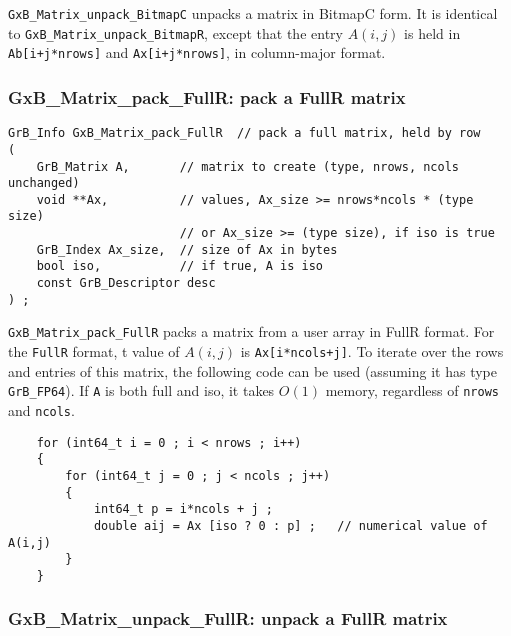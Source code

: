 \documentclass[12pt]{article}
\begin{document}
\verb'GxB_Matrix_unpack_BitmapC' unpacks a matrix in BitmapC form.
It is identical to \verb'GxB_Matrix_unpack_BitmapR', except that the
entry $A(i,j)$ is held in \verb'Ab[i+j*nrows]' and \verb'Ax[i+j*nrows]',
in column-major format.

\newpage
\subsubsection{{\sf GxB\_Matrix\_pack\_FullR:} pack a FullR matrix}
\label{matrix_pack_fullr}

\begin{mdframed}[userdefinedwidth=6in]
{\footnotesize
\begin{verbatim}
GrB_Info GxB_Matrix_pack_FullR  // pack a full matrix, held by row
(
    GrB_Matrix A,       // matrix to create (type, nrows, ncols unchanged)
    void **Ax,          // values, Ax_size >= nrows*ncols * (type size)
                        // or Ax_size >= (type size), if iso is true
    GrB_Index Ax_size,  // size of Ax in bytes
    bool iso,           // if true, A is iso
    const GrB_Descriptor desc
) ;
\end{verbatim}
} \end{mdframed}

\verb'GxB_Matrix_pack_FullR' packs a matrix from a user array in FullR format.
For the \verb'FullR' format, t value of $A(i,j)$ is \verb'Ax[i*ncols+j]'.  To
iterate over the rows and entries of this matrix, the following code can be
used (assuming it has type \verb'GrB_FP64').  If \verb'A' is both full and iso,
it takes $O(1)$ memory, regardless of \verb'nrows' and \verb'ncols'.

    \vspace{-0.1in}
    {\footnotesize
    \begin{verbatim}
    for (int64_t i = 0 ; i < nrows ; i++)
    {
        for (int64_t j = 0 ; j < ncols ; j++)
        {
            int64_t p = i*ncols + j ;
            double aij = Ax [iso ? 0 : p] ;   // numerical value of A(i,j)
        }
    } \end{verbatim}}

\subsubsection{{\sf GxB\_Matrix\_unpack\_FullR:} unpack a FullR matrix}
\label{matrix_unpack_fullr}
\end{document}

